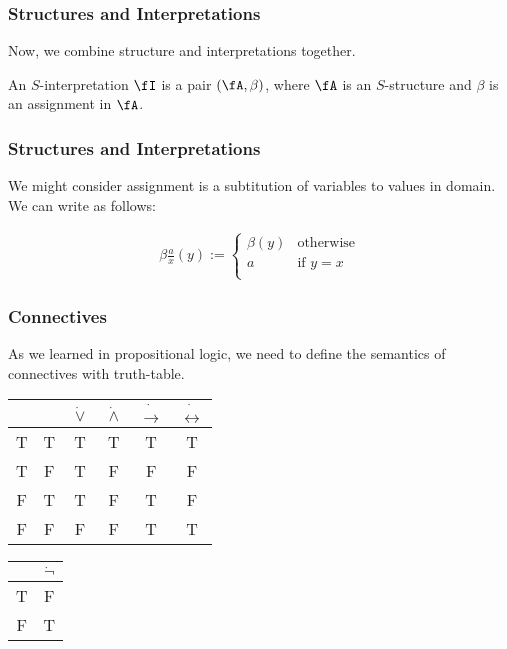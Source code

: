 \begin{frame}
    \frametitle{Structures and Interpretations}

    Now, we combine structure and interpretations together.

    \begin{definition}
        An $S$-interpretation $\fI$ is a pair $(\fA, \beta)$, where $\fA$ is an $S$-structure and $\beta$ is an assignment in $\fA$.
    \end{definition}
\end{frame}

\begin{frame}
    \frametitle{Structures and Interpretations}

    We might consider assignment is a subtitution of variables to values in domain.
    We can write as follows:

    \begin{align}
        \beta \frac{a}{x} (y) := \begin{cases}
            \beta(y) & \text{otherwise} \\
            a & \text{if } y = x \\
        \end{cases}
    \end{align}
    
\end{frame}

\begin{frame}
    \frametitle{Connectives}

    As we learned in propositional logic, we need to define the semantics of connectives with truth-table.


    \begin{table}
    \begin{tabular}{cc|c|c|c|c}
        & & $\dot{\vee}$ & $\dot{\wedge}$ & $\dot{\to}$ & $\dot{\leftrightarrow}$ \\ 
        \hline
        T & T & T & T & T & T \\
        T & F & T & F & F & F \\
        F & T & T & F & T & F \\
        F & F & F & F & T & T \\
    \end{tabular}
    \begin{tabular}{c|c}
        & $\dot{\neg}$ \\
        \hline
        T & F \\
        F & T \\
    \end{tabular}
    \end{table}
    
\end{frame}

